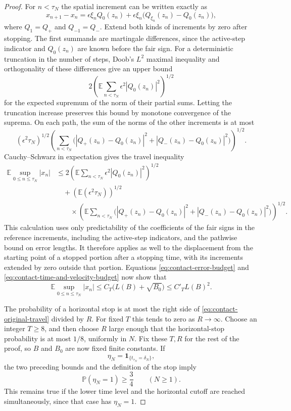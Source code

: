 \begin{proof}
For $n<\tau_N$ the spatial increment can be written exactly as
\[
  x_{n+1}-x_n
   =\epsilon\xi_n Q_0(z_n)
     +\epsilon\xi_n\bigl(Q_{\xi_n}(z_n)-Q_0(z_n)\bigr),
\]
where $Q_{1}=Q_+$ and $Q_{-1}=Q_-$.  Extend both kinds of increments by
zero after stopping.  The first summands are martingale differences, since
the active-step indicator and $Q_0(z_n)$ are known before the fair sign.
For a deterministic truncation in the number of steps, Doob's $L^2$ maximal
inequality and
orthogonality of these differences give an upper bound
\[
  2\left(\mathbb E\sum_{n<\tau_N}\epsilon^2|Q_0(z_n)|^2\right)^{1/2}
\]
for the expected supremum of the norm of their partial sums.  Letting the
truncation increase preserves this bound by monotone convergence of the
suprema.  On each path, the sum of the norms of the other increments is at
most
\[
  (\epsilon^2\tau_N)^{1/2}
  \left(\sum_{n<\tau_N}
       \bigl(|Q_+(z_n)-Q_0(z_n)|^2+|Q_-(z_n)-Q_0(z_n)|^2\bigr)\right)^{1/2}.
\]
Cauchy--Schwarz in expectation gives the travel inequality
\begin{equation}\label{eq:contact-travel-inequality}
\begin{split}
  \mathbb E\sup_{0\le n\le\tau_N}|x_n|
  &\le 2\left(\mathbb E\sum_{n<\tau_N}
                    \epsilon^2|Q_0(z_n)|^2\right)^{1/2}\\
  &\quad+\left(\mathbb E(\epsilon^2\tau_N)\right)^{1/2}\\
  &\qquad\times\left(\mathbb E\sum_{n<\tau_N}
       \bigl(|Q_+(z_n)-Q_0(z_n)|^2+|Q_-(z_n)-Q_0(z_n)|^2\bigr)\right)^{1/2}.
\end{split}
\end{equation}
This calculation uses only predictability of the coefficients of the fair
signs in the reference increments, including the active-step indicators,
and the pathwise bound on error lengths.  It therefore applies as well to
the displacement from the starting point of a stopped portion after a stopping
time, with its increments extended by zero outside that portion.  Equations \eqref{eq:contact-error-budget} and
\eqref{eq:contact-time-and-velocity-budget} now show that
\begin{equation}\label{eq:contact-original-travel}
  \mathbb E\sup_{0\le n\le\tau_N}|x_n|
    \le C_T\bigl(L(B)+\sqrt{B_0}\bigr)
    \le C'_T L(B)^2.
\end{equation}

The probability of a horizontal stop is at most the right side of
\eqref{eq:contact-original-travel} divided by $R$. For fixed $T$ this tends
to zero as $R\to\infty$. Choose an integer $T\ge8$, and then choose $R$
large enough that
the horizontal-stop probability is at most $1/8$, uniformly in $N$.
Fix these $T,R$ for the rest of the proof, so $B$ and $B_0$ are now fixed
finite constants.  If
\[
  \eta_N=\mathbf1_{\{t_{\tau_N}=\delta_N\}},
\]
the two preceding bounds and the definition of the stop imply
\begin{equation}\label{eq:contact-lower-hit-probability}
  \mathbb P(\eta_N=1)\ge\frac34\qquad(N\ge1).
\end{equation}
This remains true if the lower time level and the horizontal cutoff are
reached simultaneously, since that case has $\eta_N=1$.


\end{proof}
